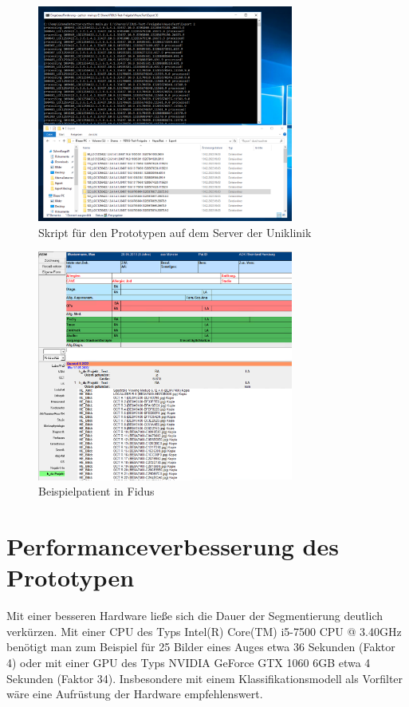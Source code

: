 \begin{figure}[ht!]
\centering
\includegraphics[width=0.75\textwidth]{./pic/Prototyp/server.png} 
\caption{\label{fig:server}Skript für den Prototypen auf dem Server der Uniklinik}
\end{figure}

\begin{figure}[ht!]
\centering
\includegraphics[width=0.75\textwidth]{./pic/Prototyp/fidus.png} 
\caption{\label{fig:fidus_beispielpatient}Beispielpatient in Fidus}
\end{figure}

\section{Performanceverbesserung des Prototypen}

Mit einer besseren Hardware ließe sich die Dauer der Segmentierung deutlich verkürzen. Mit einer CPU des Typs Intel(R) Core(TM) i5-7500 CPU @ 3.40GHz benötigt man zum Beispiel für 25 Bilder eines Auges etwa 36 Sekunden (Faktor 4) oder mit einer GPU des Typs NVIDIA GeForce GTX 1060 6GB etwa 4 Sekunden (Faktor 34). Insbesondere mit einem Klassifikationsmodell als Vorfilter wäre eine Aufrüstung der Hardware empfehlenswert.